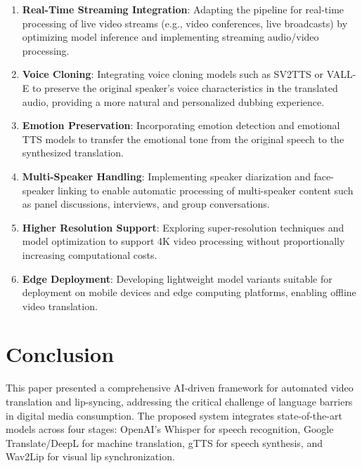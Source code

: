 \documentclass[conference]{IEEEtran}
\begin{document}
\begin{enumerate}
    \item \textbf{Real-Time Streaming Integration}: Adapting the pipeline for real-time processing of live video streams (e.g., video conferences, live broadcasts) by optimizing model inference and implementing streaming audio/video processing.
    
    \item \textbf{Voice Cloning}: Integrating voice cloning models such as SV2TTS \cite{b12} or VALL-E to preserve the original speaker's voice characteristics in the translated audio, providing a more natural and personalized dubbing experience.
    
    \item \textbf{Emotion Preservation}: Incorporating emotion detection and emotional TTS models to transfer the emotional tone from the original speech to the synthesized translation.
    
    \item \textbf{Multi-Speaker Handling}: Implementing speaker diarization and face-speaker linking to enable automatic processing of multi-speaker content such as panel discussions, interviews, and group conversations.
    
    \item \textbf{Higher Resolution Support}: Exploring super-resolution techniques and model optimization to support 4K video processing without proportionally increasing computational costs.
    
    \item \textbf{Edge Deployment}: Developing lightweight model variants suitable for deployment on mobile devices and edge computing platforms, enabling offline video translation.
\end{enumerate}

\section{Conclusion}

This paper presented a comprehensive AI-driven framework for automated video translation and lip-syncing, addressing the critical challenge of language barriers in digital media consumption. The proposed system integrates state-of-the-art models across four stages: OpenAI's Whisper for speech recognition, Google Translate/DeepL for machine translation, gTTS for speech synthesis, and Wav2Lip for visual lip synchronization.
\end{document}
